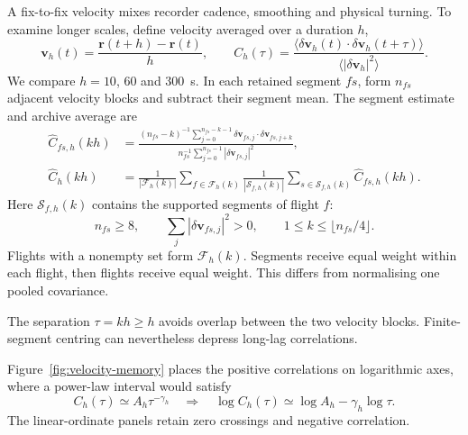 A fix-to-fix velocity mixes recorder cadence, smoothing and physical turning. To examine
longer scales, define velocity averaged over a duration $h$,
\begin{equation}
  \mathbf v_h(t)=\frac{\mathbf r(t+h)-\mathbf r(t)}{h},\qquad
  C_h(\tau)=\frac{\langle\delta\mathbf v_h(t)\cdot
                             \delta\mathbf v_h(t+\tau)\rangle}
                         {\langle|\delta\mathbf v_h|^2\rangle}.
  \label{eq:vacf}
\end{equation}
We compare $h=10$, $60$ and \SI{300}{\second}. In each retained segment $fs$,
form $n_{fs}$ adjacent velocity blocks and subtract their segment mean.
The segment estimate and archive average are
\begin{equation}
\begin{aligned}
 \widehat C_{fs,h}(kh)
 &=\frac{(n_{fs}-k)^{-1}\sum_{j=0}^{n_{fs}-k-1}
       \delta\mathbf v_{fs,j}\cdot\delta\mathbf v_{fs,j+k}}
      {n_{fs}^{-1}\sum_{j=0}^{n_{fs}-1}|\delta\mathbf v_{fs,j}|^2},\\[4pt]
 \widehat C_h(kh)
 &=\frac1{|\mathcal F_h(k)|}\sum_{f\in\mathcal F_h(k)}
   \frac1{|\mathcal S_{f,h}(k)|}\sum_{s\in\mathcal S_{f,h}(k)}\widehat C_{fs,h}(kh).
\end{aligned}
\label{eq:vacf-estimator}
\end{equation}
Here $\mathcal S_{f,h}(k)$ contains the supported segments of flight $f$:
\[
 n_{fs}\ge8,\qquad
 \sum_j|\delta\mathbf v_{fs,j}|^2>0,\qquad
 1\le k\le\lfloor n_{fs}/4\rfloor.
\]
Flights with a nonempty set form $\mathcal F_h(k)$. Segments receive equal weight
within each flight, then flights receive equal weight. This differs from normalising
one pooled covariance.

The separation $\tau=kh\ge h$ avoids overlap between the two velocity blocks.
Finite-segment centring can nevertheless depress long-lag correlations.

Figure~\ref{fig:velocity-memory} places the positive correlations on logarithmic axes,
where a power-law interval would satisfy
\begin{equation}
 C_h(\tau)\simeq A_h\tau^{-\gamma_h}
 \quad\Longrightarrow\quad
 \log C_h(\tau)\simeq\log A_h-\gamma_h\log\tau.
 \label{eq:vacf-loglaw}
\end{equation}
The linear-ordinate panels retain zero crossings and negative correlation.

